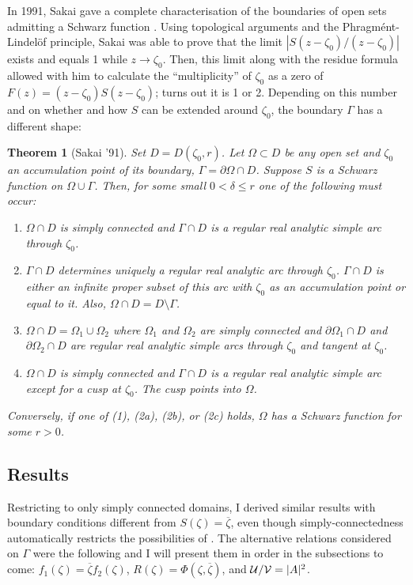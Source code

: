 \documentclass[11pt]{amsart} %
\newtheorem{theorem}{Theorem}%
\theoremstyle{remark} %
\theoremstyle{definition} %
\numberwithin{equation}{section} %
\newcommand{\bd}{\partial} %
\newcommand{\0}[1]{\overline{#1}} %
\newcommand{\1}[1]{\tilde{#1}} %
\newcommand{\2}[1]{{}_{|#1}} %
\begin{document}
In 1991, Sakai gave a complete characterisation of the boundaries of open sets admitting a Schwarz function \cite{Sak1991}. Using topological arguments and the Phragm\'ent-Lindel\"of principle, Sakai was able to prove that the limit $|S(z-ζ_0)/(z-ζ_0)|$ exists and equals 1 while $z\to ζ_0$. Then, this limit along with the residue formula allowed with him to calculate the \enquote{multiplicity} of $ζ_0$ as a zero of $F(z)=(z-ζ_0)S(z-ζ_0)$; turns out it is 1 or 2. Depending on this number and on whether and how $S$ can be extended around $ζ_0$, the boundary $Γ$ has a different shape:
\begin{theorem}[Sakai '91]	\label{SakTheorem}
	Set $D=D(ζ_0,r)$. Let $Ω\subset D$ be any open set and $ζ_0$ an accumulation point of its boundary, $Γ=\bd Ω\cap D$. Suppose $S$ is a Schwarz function on $Ω\cup Γ$.	Then, for some small $0<δ\leq r$ one of the following must occur:
	\begin{enumerate}[(2a)]
		\item[(1)] $Ω\cap D$ is simply connected and $Γ\cap D$ is a regular real analytic simple arc through $ζ_0$.
		\item $Γ\cap D$ determines uniquely a regular real analytic arc through $ζ_0$. $Γ\cap D$ is either an infinite proper subset of this arc with $ζ_0$ as an accumulation point or equal to it. Also, $Ω\cap D=D\setminus Γ$.
		\item $Ω\cap D=Ω_1\cup Ω_2$ where $Ω_1$ and $Ω_2$ are simply connected and $\bd Ω_1\cap D$ and $\bd Ω_2\cap D$ are regular real analytic simple arcs through $ζ_0$ and tangent at $ζ_0$.
		\item $Ω\cap D$ is simply connected and $Γ\cap D$ is a regular real analytic simple arc except for a cusp at $ζ_0$. The cusp points into $Ω$.
	\end{enumerate}
	
	Conversely, if one of (1), (2a), (2b), or (2c) holds, $Ω$ has a Schwarz function for some $r>0$.
\end{theorem}

\subsection*{Results}	%
Restricting to only simply connected domains, I derived similar results with boundary conditions different from $S(ζ)=\0{ζ}$, even though simply-connectedness automatically restricts the possibilities of . The alternative relations considered on $Γ$ were the following and I will present them in order in the subsections to come: $f_1(ζ)=\0{ζ}f_2(ζ)$, $R(ζ)=Φ(ζ,\0{ζ})$, and ${\mathcal{U}}/{\mathcal{V}}=|A|^2$.
\end{document}
